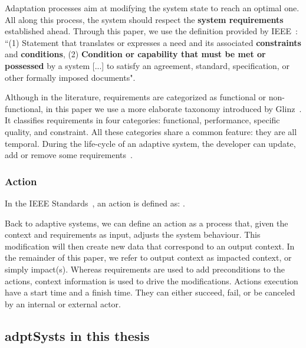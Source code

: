 Adaptation processes aim at modifying the system state to reach an optimal one.
All along this process, the system should respect the \textbf{system requirements} established ahead. 
Through this paper, we use the definition provided by IEEE~\cite{iso2017systems}: ``(1) Statement that translates or expresses a need and its associated \textbf{constraints} and \textbf{conditions}, (2) \textbf{Condition or capability that must be met or possessed} by a system [...] to satisfy an agreement, standard, specification, or other formally imposed documents".

Although in the literature, requirements are categorized as functional or non-func\-tional, in this paper we use a more elaborate taxonomy introduced by Glinz~\cite{DBLP:conf/re/Glinz07}.
It classifies requirements in four categories: functional, performance, specific quality, and constraint.
All these categories share a common feature: they are all temporal.
During the life-cycle of an adaptive system, the developer can update, add or remove some requirements~\cite{DBLP:conf/icse/ChengA07, pandey2010effective}.

\subsubsection{Action}
In the IEEE Standards~\cite{iso2017systems}, an action is defined as: .

Back to adaptive systems, we can define an action as a process that, given the context and requirements as input, adjusts the system behaviour.
This modification will then create new data that correspond to an output context. In the remainder of this paper, we refer to output context as impacted context, or simply impact(s).
Whereas requirements are used to add preconditions to the actions, context information is used to drive the modifications.
Actions execution have a start time and a finish time. They can either succeed, fail, or be canceled by an internal or external actor.

\subsection[Adaptive systems in the context of this thesis]{\Glspl{adptSyst} in this thesis}

